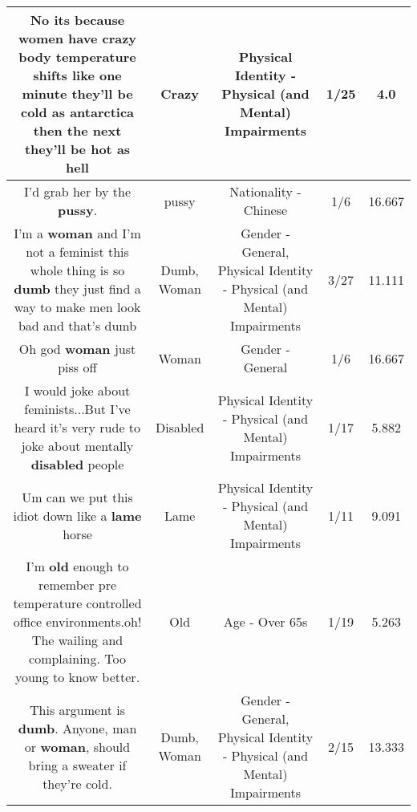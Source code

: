 \documentclass[11pt]{article}
\newlength\mylength
\begin{document}
\begin{center}
\begin{longtable}{|C{.65\mylength}|C{.30\mylength}|C{.12\mylength}|C{.12\mylength}|C{.12\mylength}|}
  \small No its because women have \textbf{crazy} body temperature shifts like one minute they'll be cold as antarctica then the next they'll be hot as hell\normalsize   & Crazy & Physical Identity - Physical (and Mental) Impairments & 1/25 & 4.0 \\  \hline
  \small I'd grab her by the \textbf{pussy}.\normalsize   & pussy & Nationality - Chinese & 1/6 & 16.667 \\  \hline
  \small I'm a \textbf{woman} and I'm not a feminist this whole thing is so \textbf{dumb} they just find a way to make men look bad and that's dumb\normalsize   & Dumb, Woman & Gender - General, Physical Identity - Physical (and Mental) Impairments & 3/27 & 11.111 \\  \hline
  \small Oh god \textbf{woman} just piss off\normalsize   & Woman & Gender - General & 1/6 & 16.667 \\  \hline
  \small I would joke about feminists...But I've heard it's very rude to joke about mentally \textbf{disabled} people\normalsize   & Disabled & Physical Identity - Physical (and Mental) Impairments & 1/17 & 5.882 \\  \hline
  \small Um can we put this idiot down like a \textbf{lame} horse\normalsize   & Lame & Physical Identity - Physical (and Mental) Impairments & 1/11 & 9.091 \\  \hline
  \small I'm \textbf{old} enough to remember pre temperature controlled office environments.oh! The wailing and complaining. Too young to know better.\normalsize   & Old & Age - Over 65s & 1/19 & 5.263 \\  \hline
  \small This argument is \textbf{dumb}. Anyone, man or \textbf{woman}, should bring a sweater if they're cold.\normalsize   & Dumb, Woman & Gender - General, Physical Identity - Physical (and Mental) Impairments & 2/15 & 13.333 \\  \hline

\end{longtable}
\end{center}
\end{document}
